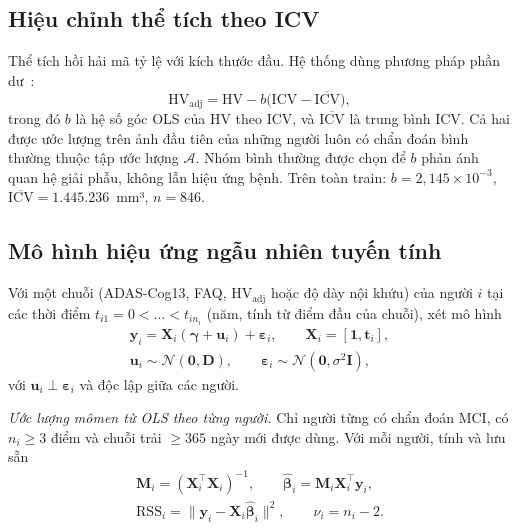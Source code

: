 \documentclass[journal]{IEEEtran}
\newcommand{\HVadj}{\mathrm{HV}_{\text{adj}}}
\begin{document}
\subsection{Hiệu chỉnh thể tích theo ICV}
Thể tích hồi hải mã tỷ lệ với kích thước đầu. Hệ thống dùng phương pháp phần dư~\cite{voevodskaya2014}:
\begin{equation}\label{eq:icv}
\HVadj = \mathrm{HV} - b\bigl(\mathrm{ICV}-\overline{\mathrm{ICV}}\bigr),
\end{equation}
trong đó $b$ là hệ số góc OLS của HV theo ICV, và $\overline{\mathrm{ICV}}$ là trung bình ICV. Cả hai được ước lượng trên ảnh đầu tiên của những người luôn có chẩn đoán bình thường thuộc tập ước lượng $\mathcal A$. Nhóm bình thường được chọn để $b$ phản ánh quan hệ giải phẫu, không lẫn hiệu ứng bệnh. Trên toàn train: $b=2{,}145\times10^{-3}$, $\overline{\mathrm{ICV}}=1.445.236$~mm³, $n=846$.

\subsection{Mô hình hiệu ứng ngẫu nhiên tuyến tính}
Với một chuỗi (ADAS-Cog13, FAQ, $\HVadj$ hoặc độ dày nội khứu) của người $i$ tại các thời điểm $t_{i1}=0<\dots<t_{in_i}$ (năm, tính từ điểm đầu của chuỗi), xét mô hình~\cite{laird1982}
\begin{equation}\label{eq:lme}
\begin{gathered}
\bm y_i = \bm X_i(\bm\gamma+\bm u_i)+\bm\varepsilon_i,\qquad \bm X_i=[\bm 1, \bm t_i],\\
\bm u_i\sim\mathcal N(\bm 0,\bm D),\qquad \bm\varepsilon_i\sim\mathcal N(\bm 0,\sigma^2\bm I),
\end{gathered}
\end{equation}
với $\bm u_i\perp\bm\varepsilon_i$ và độc lập giữa các người.

\emph{Ước lượng mômen từ OLS theo từng người.} Chỉ người từng có chẩn đoán MCI, có $n_i\ge 3$ điểm và chuỗi trải $\ge 365$ ngày mới được dùng. Với mỗi người, tính và lưu sẵn
\[
\begin{gathered}
\bm M_i=(\bm X_i^\top\bm X_i)^{-1},\qquad \hat{\bm\beta}_i=\bm M_i\bm X_i^\top\bm y_i,\\
\mathrm{RSS}_i=\|\bm y_i-\bm X_i\hat{\bm\beta}_i\|^2,\qquad \nu_i=n_i-2.
\end{gathered}
\]
\end{document}
